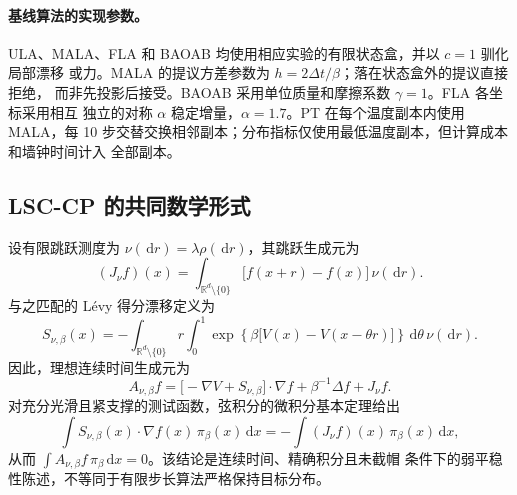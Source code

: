 \documentclass[11pt,a4paper]{article}
\newcommand{\R}{\mathbb{R}}
\newcommand{\dd}{\,\mathrm{d}}
\begin{document}
\paragraph{基线算法的实现参数。}
ULA、MALA、FLA 和 BAOAB 均使用相应实验的有限状态盒，并以 $c=1$ 驯化局部漂移
或力。MALA 的提议方差参数为 $h=2\Delta t/\beta$；落在状态盒外的提议直接拒绝，
而非先投影后接受。BAOAB 采用单位质量和摩擦系数 $\gamma=1$。FLA 各坐标采用相互
独立的对称 $\alpha$ 稳定增量，$\alpha=1.7$。PT 在每个温度副本内使用 MALA，每
10 步交替交换相邻副本；分布指标仅使用最低温度副本，但计算成本和墙钟时间计入
全部副本。

\subsection{LSC-CP 的共同数学形式}

设有限跳跃测度为 $\nu(\dd r)=\lambda\rho(\dd r)$，其跳跃生成元为
\begin{equation}
 (J_\nu f)(x)
 =\int_{\R^d\setminus\{0\}}\bigl[f(x+r)-f(x)\bigr]\,\nu(\dd r).
\end{equation}
与之匹配的 Lévy 得分漂移定义为
\begin{equation}
 S_{\nu,\beta}(x)
 =-\int_{\R^d\setminus\{0\}}r\int_0^1
 \exp\!\left\{\beta\bigl[V(x)-V(x-\theta r)\bigr]\right\}
 \dd\theta\,\nu(\dd r).
 \label{eq:zh-levy-score}
\end{equation}
因此，理想连续时间生成元为
\begin{equation}
 A_{\nu,\beta}f
 =\bigl[-\nabla V+S_{\nu,\beta}\bigr]\mathbin{\cdot}\nabla f
 +\beta^{-1}\Delta f+J_\nu f .
\end{equation}
对充分光滑且紧支撑的测试函数，弦积分的微积分基本定理给出
\begin{equation}
 \int S_{\nu,\beta}(x)\mathbin{\cdot}\nabla f(x)\,\pi_\beta(x)\dd x
 =-\int(J_\nu f)(x)\,\pi_\beta(x)\dd x,
\end{equation}
从而 $\int A_{\nu,\beta}f\,\pi_\beta\dd x=0$。该结论是连续时间、精确积分且未截帽
条件下的弱平稳性陈述，不等同于有限步长算法严格保持目标分布。
\end{document}
